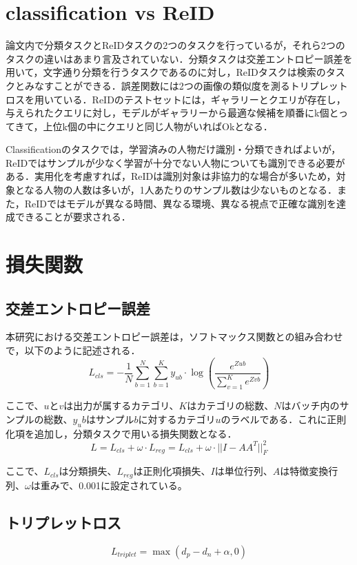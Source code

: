 \documentclass[dvipdfmx]{jsarticle}
\begin{document}
\section{classification vs ReID}
論文内で分類タスクとReIDタスクの2つのタスクを行っているが，それら2つのタスクの違いはあまり言及されていない．分類タスクは交差エントロピー誤差を用いて，文字通り分類を行うタスクであるのに対し，ReIDタスクは検索のタスクとみなすことができる．誤差関数には2つの画像の類似度を測るトリプレットロスを用いている．ReIDのテストセットには，ギャラリーとクエリが存在し，与えられたクエリに対し，モデルがギャラリーから最適な候補を順番にk個とってきて，上位k個の中にクエリと同じ人物がいればOkとなる．

Classificationのタスクでは，学習済みの人物だけ識別・分類できればよいが，ReIDではサンプルが少なく学習が十分でない人物についても識別できる必要がある．実用化を考慮すれば，ReIDは識別対象は非協力的な場合が多いため，対象となる人物の人数は多いが，1人あたりのサンプル数は少ないものとなる．また，ReIDではモデルが異なる時間、異なる環境、異なる視点で正確な識別を達成できることが要求される．

\section{損失関数}
\subsection{交差エントロピー誤差}
本研究における交差エントロピー誤差は，ソフトマックス関数との組み合わせで，以下のように記述される．
\begin{equation}
    L_{cls} = -\frac{1}{N}\sum_{b=1}^{N} \sum_{b=1}^{K} y_{ub} \cdot \log{(\frac{e^{Z ub}}{\sum_{v=1}^{K} e^{Z vb}})}
\end{equation}

ここで、$u$と$v$は出力が属するカテゴリ、$K$はカテゴリの総数、$N$はバッチ内のサンプルの総数、$y_ub$はサンプル$b$に対するカテゴリ$u$のラベルである．これに正則化項を追加し，分類タスクで用いる損失関数となる．
\begin{equation}
    L = L_{cls} + \omega \cdot L_{reg} = L_{cls} + \omega \cdot ||I - AA^T||_{F}^2
\end{equation}

ここで、$L_{cls}$は分類損失、$L_{reg}$は正則化項損失、$I$は単位行列、$A$は特徴変換行列、$\omega$は重みで、0.001に設定されている。
\subsection{トリプレットロス}
\begin{equation}
    L_{triplet} = \max{(d_p - d_n + \alpha, 0)}
\end{equation}
\end{document}
